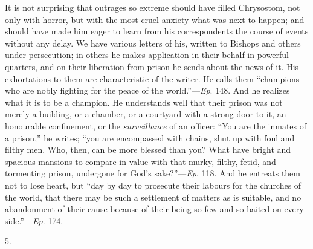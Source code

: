 It is not surprising that outrages so extreme should have filled
Chrysostom, not only with horror, but with the most cruel anxiety what
was next to happen; and should have made him eager to learn from his
correspondents the course of events without any delay. We have various
letters of his, written to Bishops and others under persecution; in
others he makes application in their behalf in powerful quarters, and
on their liberation from prison he sends about the news of it.
His exhortations to them are characteristic of the writer. He calls
them ``champions who are nobly fighting for the peace of the
world.''—\emph{Ep}. 148. And he realizes what it is to be a
champion. He understands well that their prison was not merely a
building, or a chamber, or a courtyard with a strong door to it, an
honourable confinement, or the \emph{surveillance} of an officer:
``You are the inmates of a prison,'' he writes; ``you are
encompassed with chains, shut up with foul and filthy men. Who, then,
can be more blessed than you? What have bright and spacious mansions
to compare in value with that murky, filthy, fetid, and tormenting
prison, undergone for God's sake?''—\emph{Ep}. 118. And he
entreats them not to lose heart, but ``day by day to prosecute
their labours for the churches of the world, that there may be such a
settlement of matters as is suitable, and no abandonment of their
cause because of their being so few and so baited on every side.''—\emph{Ep}.
174.

5.

